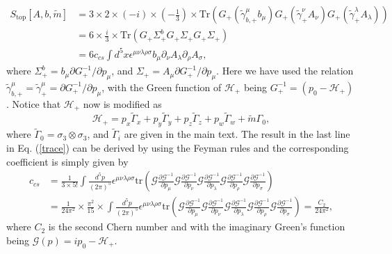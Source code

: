 \documentclass[twocolumn,prl,10pt,superscriptaddress]{revtex4}
\begin{document}
\begin{appendix}
\begin{equation}
\begin{aligned}\label{trace}
S_{\text{top}}[A,b,\tilde{m}]&=3\times 2\times (-i)\times (-\frac{1}{3})\times\text{Tr}\left(G_+(\tilde{\gamma}^{\mu}_{b,+}b_{\mu})G_+(\tilde{\gamma}^{\nu}_{+}A_{\nu})G_+(\tilde{\gamma}^{\lambda}_{+}A_{\lambda})\right)\\
&=6\times\frac{i}{3}\times\text{Tr}\left(G_+\Sigma_{+}^bG_+\Sigma_{+}G_+\Sigma_{+}\right)\\
&=6c_{cs}\int d^5x \epsilon^{\mu\nu\lambda\rho\sigma}b_{\mu}\partial_{\nu}{A}_{\lambda}\partial_{\rho}{A}_{\sigma},
\end{aligned}
\end{equation}
where $\Sigma_+^b=b_\mu\partial G^{-1}_{+}/\partial{p_\mu}$, and $\Sigma_+=A_\mu\partial G^{-1}_{+}/\partial{p_\mu}$. Here we have used the relation $\tilde{\gamma}_{b,+}^{\mu}=\tilde{\gamma}_{+}^{\mu}=\partial G^{-1}_{+}/\partial{p_\mu}$, with the Green function of $\mathcal{H}_+$ being $G_+^{-1}=(p_0-\mathcal{H}_+)$. Notice that $\mathcal{H}_+$ now is modified as
\begin{equation}
\mathcal{H}_+=p_x\tilde{\Gamma}_x+p_y\tilde{\Gamma}_y+p_z\tilde{\Gamma}_z+p_w\tilde{\Gamma}_w+\tilde{m}\Gamma_0,
\end{equation}
where $\tilde{\Gamma}_0=\sigma_3\otimes\sigma_3$, and $\tilde{\Gamma}_i$ are given in the main text.  The result in the last line in Eq. (\ref{trace}) can be derived by using the Feyman rules\cite{Golterman,Fukaya, Ramamurthy,XLQi2008} and the corresponding coefficient is simply given by
\begin{equation}
\begin{aligned}\label{coefficient}
c_{cs}&=\frac{1}{3\times5!}\int\frac{d^5p}{(2\pi)^5}\epsilon^{\mu\nu\lambda\rho\sigma}\text{tr}\left(\mathcal{G}\frac{\partial \mathcal{G}^{-1}}{\partial p_{\mu}}\mathcal{G}\frac{\partial \mathcal{G}^{-1}}{\partial p_{\nu}}\mathcal{G}\frac{\partial \mathcal{G}^{-1}}{\partial p_{\lambda}}\mathcal{G}\frac{\partial \mathcal{G}^{-1}}{\partial p_{\rho}}\mathcal{G}\frac{\partial \mathcal{G}^{-1}}{\partial p_{\sigma}}\right)\\
&=\frac{1}{24\pi^2}\times\frac{\pi^2}{15}\times\int\frac{d^5p}{(2\pi)^5}\epsilon^{\mu\nu\lambda\rho\sigma}\text{tr}\left(\mathcal{G}\frac{\partial \mathcal{G}^{-1}}{\partial p_{\mu}}\mathcal{G}\frac{\partial \mathcal{G}^{-1}}{\partial p_{\nu}}\mathcal{G}\frac{\partial \mathcal{G}^{-1}}{\partial p_{\lambda}}\mathcal{G}\frac{\partial \mathcal{G}^{-1}}{\partial p_{\rho}}\mathcal{G}\frac{\partial \mathcal{G}^{-1}}{\partial p_{\sigma}}\right)=\frac{C_2}{24\pi^2},
\end{aligned}
\end{equation}
where $C_2$ is the second Chern number and with the imaginary Green's function being $\mathcal{G}(p)=ip_0-\mathcal{H}_+$.



\end{appendix}
\end{document}
